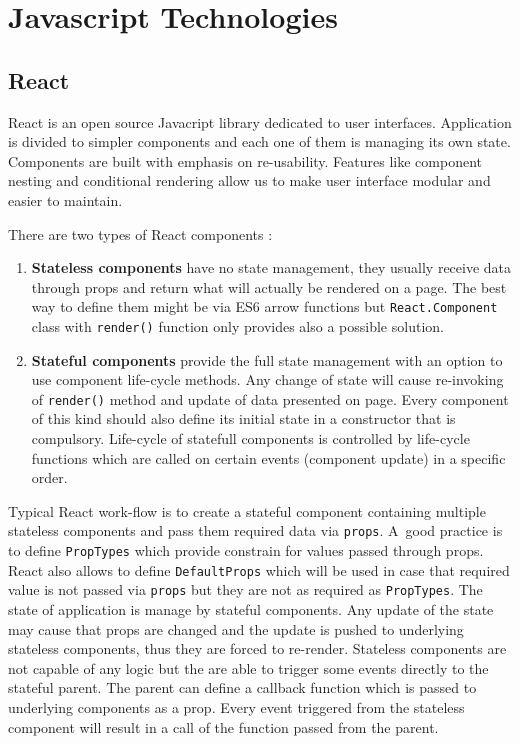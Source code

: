 \chapter{Javascript Technologies}

\section{React}
React is an open source Javacript library dedicated to user interfaces. Application is divided to simpler components and each one of them is managing its own state. Components are built with emphasis on re-usability. Features like component nesting and conditional rendering \cite{conditional} allow us to make user interface modular and easier to maintain.

There are two types of React components \cite{React}:
\begin{enumerate}
\item \textbf{Stateless components} have no state management, they usually receive data through props and return what will actually be rendered on a page. The best way to define them might be via ES6 arrow functions \cite{arrowFunctions} but \texttt{React.Component} class with \texttt{render()} function only provides also a possible solution.

\item \textbf{Stateful components} provide the full state management with an option to use component life-cycle methods. Any change of state will cause re-invoking of \texttt{render()} method and update of data presented on page. Every component of this kind should also define its initial state in a constructor that is compulsory.
Life-cycle of statefull components is controlled by life-cycle functions which are called on certain events (component update) in a specific order.
\end{enumerate}

Typical React work-flow is to create a stateful component containing multiple stateless components and pass them required data via \texttt{props}. A~good practice is to define \texttt{PropTypes} which provide constrain for values passed through props. React also allows to define \texttt{DefaultProps} which will be used in case that required value is not passed via \texttt{props} but they are not as required as \texttt{PropTypes}. The state of application is manage by stateful components. Any update of the state may cause that props are changed and the update is pushed to underlying stateless components, thus they are forced to re-render. Stateless components are not capable of any logic but the are able to trigger some events directly to the stateful parent. The parent can define a callback function which is passed to underlying components as a prop. Every event triggered from the stateless component will result in a call of the function passed from the parent. 

